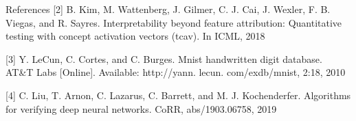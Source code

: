 \documentclass[final]{beamer}
\begin{document}
\begin{frame}[fragile]{}
\begin{textblock}{\colwidth}
\begin{paddedBlock}{References}
\footnotesize{[2] B. Kim, M. Wattenberg, J. Gilmer, C. J. Cai, J. Wexler, F. B. Viegas, and R. Sayres. Interpretability beyond feature attribution: Quantitative testing with concept activation vectors (tcav). In ICML, 2018}

\footnotesize{[3] Y. LeCun, C. Cortes, and C. Burges. Mnist handwritten digit database. AT&T Labs [Online]. Available: http://yann. lecun. com/exdb/mnist, 2:18, 2010}

\footnotesize{[4] C. Liu, T. Arnon, C. Lazarus, C. Barrett, and M. J. Kochenderfer. Algorithms for verifying deep neural networks. CoRR, abs/1903.06758, 2019}

\end{paddedBlock}
\end{textblock}






\end{frame}
\end{document}

